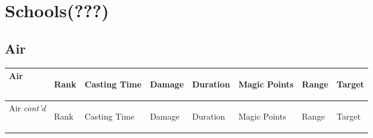 \documentclass[twoside]{book}
\begin{document}
    

\section{Schools(???)}
    
    

\subsection{Air}
    
\begin{longtable}{p{1.25in}p{2em}p{1.5em}p{4em}p{4em}lp{4em}p{4em}} 
  Air& \begin{turn}{70}{Rank}\end{turn}
          & \begin{turn}{70}{Casting Time}\end{turn}
          & \begin{turn}{70}{Damage}\end{turn}
          & \begin{turn}{70}{Duration}\end{turn}
          & \begin{turn}{70}{Magic Points}\end{turn}
          & \begin{turn}{70}{Range}\end{turn}
          & \begin{turn}{70}{Target}\end{turn}
          \\
  \hline
  \hline
  \endfirsthead
  Air \textit{cont'd}
        & \begin{turn}{70}{Rank}\end{turn}
          & \begin{turn}{70}{Casting Time}\end{turn}
          & \begin{turn}{70}{Damage}\end{turn}
          & \begin{turn}{70}{Duration}\end{turn}
          & \begin{turn}{70}{Magic Points}\end{turn}
          & \begin{turn}{70}{Range}\end{turn}
          & \begin{turn}{70}{Target}\end{turn}
           \\

\end{longtable}
\end{document}
